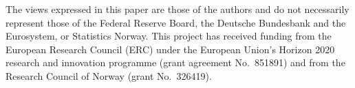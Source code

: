 \documentclass[\PathToRoot/HAFiscal]{subfiles}
\begin{document}

\newcommand{\thanksInput}[1]{%
  \IfFileExists{\PathToRoot/Subfiles/#1.tex}%
  {\ignorespaces\unskip}%
  {}%
}%

\whenintegrated{\label{funding-info}} 
\vfill
\begin{minipage}{\textwidth}
  \footnotesize The views expressed in this paper are those of the authors and do not necessarily represent those of the Federal Reserve Board, the Deutsche Bundesbank and the Eurosystem, or Statistics Norway. This project has received funding from the European Research Council (ERC) under the European Union's Horizon 2020 research and innovation programme (grant agreement No.\ 851891) and from the Research Council of Norway (grant No.\ 326419).

  
\end{minipage}

%



\titlepagefinish

\smartbib
\end{document}
